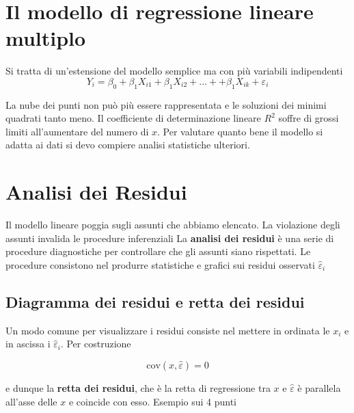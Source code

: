 \documentclass[
  11pt,
]{book}
\theoremstyle{mytheoremstyle}
\theoremstyle{mydefstyle}
\begin{document}
\section{Il modello di regressione lineare multiplo}\label{il-modello-di-regressione-lineare-multiplo}

Si tratta di un'estensione del modello semplice ma con più variabili indipendenti
\[Y_i=\beta_0+\beta_1X_{i1}+\beta_1X_{i2}+...++\beta_1X_{ik}+\varepsilon_i\]

La nube dei punti non può più essere rappresentata e le soluzioni dei minimi quadrati
tanto meno.
Il coefficiente di determinazione lineare \(R^2\) soffre di grossi limiti all'aumentare del numero
di \(x\).
Per valutare quanto bene il modello si adatta ai dati si devo compiere analisi statistiche ulteriori.

\section{Analisi dei Residui}\label{analisi-dei-residui}

Il modello lineare poggia sugli assunti che abbiamo elencato.
La violazione degli assunti invalida le procedure inferenziali
La \textbf{analisi dei residui} è una serie di procedure diagnostiche per controllare
che gli assunti siano rispettati.
Le procedure consistono nel produrre statistiche e grafici sui residui osservati
\(\hat\varepsilon_i\)

\subsection{Diagramma dei residui e retta dei residui}\label{diagramma-dei-residui-e-retta-dei-residui}

Un modo comune per visualizzare i residui consiste nel mettere in ordinata
le \(x_i\) e in ascissa i \(\hat\varepsilon_i\).
Per costruzione

\[\text{cov}(x,\hat\varepsilon)=0\]

e dunque la \textbf{retta dei residui}, che è la retta di regressione tra \(x\) e
\(\hat\varepsilon\) è parallela all'asse delle \(x\) e coincide con esso.
Esempio sui 4 punti
\end{document}
